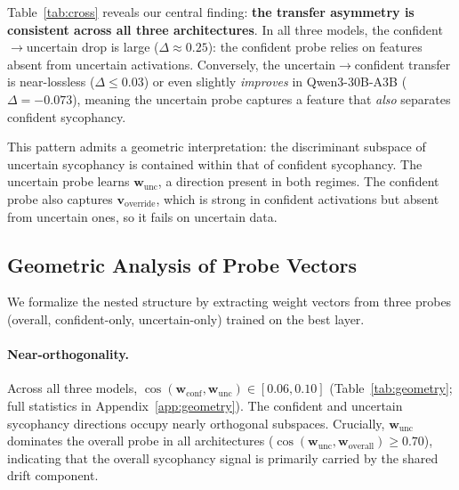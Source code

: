 \documentclass[11pt]{article}
\begin{document}
Table~\ref{tab:cross} reveals our central finding: \textbf{the transfer asymmetry is consistent across all three architectures}.
In all three models, the confident$\to$uncertain drop is large ($\Delta \approx 0.25$): the confident probe relies on features absent from uncertain activations.
Conversely, the uncertain$\to$confident transfer is near-lossless ($\Delta \leq 0.03$) or even slightly \emph{improves} in Qwen3-30B-A3B ($\Delta = -0.073$), meaning the uncertain probe captures a feature that \emph{also} separates confident sycophancy.

This pattern admits a geometric interpretation: the discriminant subspace of uncertain sycophancy is contained within that of confident sycophancy.
The uncertain probe learns $\mathbf{w}_{\text{unc}}$, a direction present in both regimes.
The confident probe also captures $\mathbf{v}_{\text{override}}$, which is strong in confident activations but absent from uncertain ones, so it fails on uncertain data.


\subsection{Geometric Analysis of Probe Vectors}

We formalize the nested structure by extracting weight vectors from three probes (overall, confident-only, uncertain-only) trained on the best layer.

\paragraph{Near-orthogonality.}
Across all three models, $\cos(\mathbf{w}_{\text{conf}}, \mathbf{w}_{\text{unc}}) \in [0.06, 0.10]$ (Table~\ref{tab:geometry}; full statistics in Appendix~\ref{app:geometry}).
The confident and uncertain sycophancy directions occupy nearly orthogonal subspaces.
Crucially, $\mathbf{w}_{\text{unc}}$ dominates the overall probe in all architectures ($\cos(\mathbf{w}_{\text{unc}}, \mathbf{w}_{\text{overall}}) \geq 0.70$), indicating that the overall sycophancy signal is primarily carried by the shared drift component.
\end{document}
